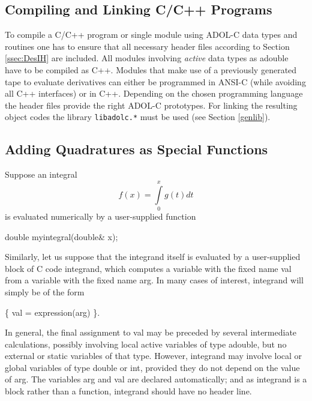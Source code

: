 \documentclass[11pt,twoside]{article}
\begin{document}
\subsection{Compiling and Linking C/C++ Programs}
%
To compile a C/C++ program or single module using ADOL-C
data types and routines one has to ensure that all necessary
header files according to Section \ref{ssec:DesIH} are 
included. All modules involving {\em active} data types as
{\sf adouble}
have to be compiled as C++. Modules that make use of a previously
generated tape to evaluate derivatives can either be programmed in ANSI-C
(while avoiding all C++ interfaces) or in C++. Depending
on the chosen programming language the header files provide
the right ADOL-C prototypes. 
For linking the resulting object codes the library \verb=libadolc.*= 
must be used (see Section \ref{genlib}). 
%
\subsection{Adding Quadratures as Special Functions}
%
\label{quadrat}
%
Suppose an integral 
\[ f(x) = \int\limits^{x}_{0} g(t) dt \]
is evaluated numerically by a user-supplied function 
\begin{center}
{\sf  double  myintegral(double\& x);}
\end{center}
Similarly, let us suppose that the integrand itself is evaluated by
a user-supplied block of C code {\sf integrand}, which computes a
variable with the fixed name {\sf val} from a variable with the fixed
name {\sf arg}. In many cases of interest, {\sf integrand} will
simply be of the form
\begin{center}
{\sf \{ val = expression(arg) \}}\enspace .
\end{center}
In general, the final assignment to {\sf val} may be preceded
by several intermediate calculations, possibly involving local 
active variables of type {\sf adouble}, but no external or static
variables of that type.  However, {\sf integrand} may involve local
or global variables of type {\sf double} or {\sf int}, provided they
do not depend on the value of {\sf arg}. The variables {\sf arg} and 
{\sf val} are declared automatically; and as {\sf integrand} is a block
rather than a function, {\sf integrand} should have no header line.  
\end{document}
